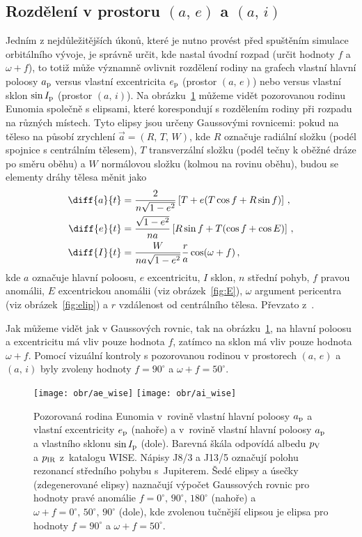 \documentclass[A4paper, 12pt, oneside]{book}
\begin{document}
\subsection{Rozdělení v prostoru $(a,\,e)$ a $(a,\,i)$}
Jedním z nejdůležitějších úkonů, které je nutno provést před spuštěním simulace orbitálního vývoje, je správně určit, kde nastal úvodní rozpad (určit hodnoty $f$ a $\omega+f$), to totiž může významně ovlivnit rozdělení rodiny na grafech vlastní hlavní poloosy $a_{\rm p}$ versus vlastní excentricita $e_{\rm p}$ (prostor $(a,\,e)$) nebo versus vlastní sklon $\sin I_{\rm p}$ (prostor $(a,\,i)$). Na obrázku~\ref{fig:ae_ai_wise} můžeme vidět pozorovanou rodinu Eunomia společně s elipsami, které korespondují s rozdělením rodiny při rozpadu na různých místech. Tyto elipsy jsou určeny Gaussovými rovnicemi: pokud na těleso na působí zrychlení $\vec{a}=(R,\,T,\,W)$, kde $R$ označuje radiální složku (podél spojnice s centrálním tělesem), $T$ transverzální složku (podél tečny k oběžné dráze po směru oběhu) a $W$ normálovou složku (kolmou na rovinu oběhu), budou se elementy dráhy tělesa měnit jako
\begin{align}
	\diff{a}{t}&=\frac{2}{n\sqrt{1-e^2}}\left[T+e(T\cos f+R\sin f)\right] \,, \\
	\diff{e}{t}&=\frac{\sqrt{1-e^2}}{na}\left[R\sin f+T(\cos f+\cos E)\right]\,, \\
	\diff{I}{t}&=\frac{W}{na\sqrt{1-e^2}}\frac{r}{a}\cos(\omega+f)\,,
\end{align}
kde $a$ označuje hlavní poloosu, $e$ excentricitu, $I$ sklon, $n$ střední pohyb, $f$ pravou anomálii, $E$ excentrickou anomálii (viz obrázek~\ref{fig:E}), $\omega$ argument pericentra (viz obrázek~\ref{fig:elip}) a $r$ vzdálenost od centrálního tělesa. Převzato z~\cite{fmt}.

Jak můžeme vidět jak v Gaussových rovnic, tak na obrázku~\ref{fig:ae_ai_wise}, na hlavní poloosu a excentricitu má vliv pouze hodnota $f$, zatímco na sklon má vliv pouze hodnota $\omega+f$. Pomocí vizuální kontroly s pozorovanou rodinou v prostorech $(a,\,e)$ a $(a,\,i)$ byly zvoleny hodnoty $f=90^\circ$ a $\omega+f=50^\circ$.
\begin{figure}
	\centering
	\texttt{[image: obr/ae\_wise]}
	\texttt{[image: obr/ai\_wise]}
	\caption{Pozorovaná rodina Eunomia v~rovině vlastní hlavní poloosy $a_{\rm p}$ a vlastní excentricity $e_{\rm p}$ (nahoře) a v~rovině vlastní hlavní poloosy $a_{\rm p}$ a vlastního sklonu $\sin I_{\rm p}$ (dole). Barevná škála odpovídá albedu $p_{\rm V}$ a $p_{\rm IR}$ z~katalogu WISE\@. Nápisy J8/3 a J13/5 označují polohu rezonancí středního pohybu s~Jupiterem. Šedé elipsy a úsečky (zdegenerované elipsy) naznačují výpočet Gaussových rovnic pro hodnoty pravé anomálie $f=0^\circ,\,90^\circ,\,180^\circ$ (nahoře) a $\omega+f=0^\circ,\, 50^\circ,\, 90^\circ$ (dole), kde zvolenou tučnější elipsou je elipsa pro hodnoty $f=90^\circ$ a $\omega+f=50^\circ$.}
	\label{fig:ae_ai_wise}
\end{figure}
\end{document}
